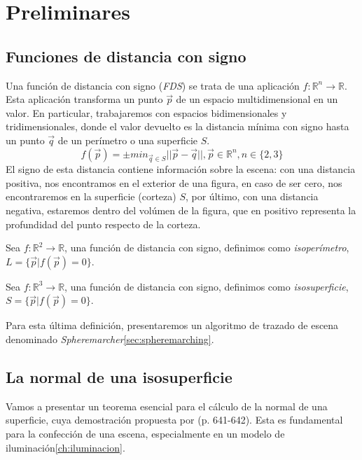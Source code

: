 \chapter{Preliminares}


\section{Funciones de distancia con signo\label{sec:fds}}

Una función de distancia con signo (\textit{FDS}) se trata de una aplicación \(f: \mathbb{R}^n\longrightarrow \mathbb{R}\). Esta aplicación transforma un punto \(\Vec{p}\) de un espacio multidimensional en un valor. En particular, trabajaremos con espacios bidimensionales y tridimensionales, donde el valor devuelto es la distancia mínima con signo hasta un punto \(\Vec{q}\) de un perímetro o una superficie \(S\). 
\[f(\Vec{p})=\pm min_{\Vec{q}\in S}\vert\vert \Vec{p}-\Vec{q} \vert\vert , \Vec{p} \in \mathbb{R}^n, n\in \{2,3\}\]
El signo de esta distancia contiene información sobre la escena: con una distancia positiva, nos encontramos en el exterior de una figura, en caso de ser cero, nos encontraremos en la superficie (corteza) \(S\), por último, con una distancia negativa, estaremos dentro del volúmen de la figura, que en positivo representa la profundidad del punto respecto de la corteza. 

\begin{definition}
	Sea \(f:\mathbb{R}^2\longrightarrow\mathbb{R}\), una función de distancia con signo, definimos como \textit{isoperímetro}, \(L=\{\Vec{p} \vert f(\Vec{p})=0\}\).
\end{definition}

\begin{definition}
	Sea \(f:\mathbb{R}^3\longrightarrow\mathbb{R}\), una función de distancia con signo, definimos como \textit{isosuperficie}, \(S=\{\Vec{p} \vert f(\Vec{p})=0\}\).
\end{definition}

Para esta última definición, presentaremos un algoritmo de trazado de escena denominado \textit{Spheremarcher}\ref{sec:spheremarching}.
\newpage
\section{La normal de una isosuperficie \label{sec:normal}}

Vamos a presentar un teorema esencial para el cálculo de la normal de una superficie, cuya demostración propuesta por  \cite{goldman2005curvature} (p. 641-642). Esta es fundamental para la confección de una escena, especialmente en un modelo de iluminación\ref{ch:iluminacion}.

